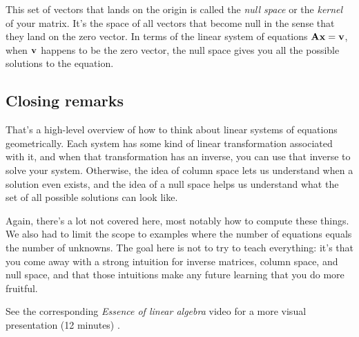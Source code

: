 This set of vectors that lands on the origin is called the \textit{null space}
or the \textit{kernel} of your matrix. It's the space of all vectors that become
null in the sense that they land on the zero vector. In terms of the linear
system of equations $\mathbf{A}\mathbf{x} = \mathbf{v}$, when $\mathbf{v}$ happens to be the
zero vector, the null space gives you all the possible solutions to the
equation.

\subsection{Closing remarks}

That's a high-level overview of how to think about linear systems of equations
geometrically. Each system has some kind of linear transformation associated
with it, and when that transformation has an inverse, you can use that inverse
to solve your system. Otherwise, the idea of column space lets us understand
when a solution even exists, and the idea of a null space helps us understand
what the set of all possible solutions can look like.

Again, there's a lot not covered here, most notably how to compute these things.
We also had to limit the scope to examples where the number of equations equals
the number of unknowns. The goal here is not to try to teach everything: it's
that you come away with a strong intuition for inverse matrices, column space,
and null space, and that those intuitions make any future learning that you do
more fruitful.

\begin{remark}
  See the corresponding \textit{Essence of linear algebra} video for a more
  visual presentation (12 minutes)
  \cite{bib:linalg_inverse_matrices_column_space_and_null_space}.
\end{remark}
